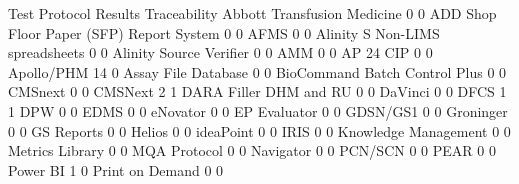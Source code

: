 \documentclass{article}
\begin{document}
\begin{Schunk}
\begin{Soutput}
                                           Test Protocol Results Traceability
  Abbott Transfusion Medicine                                  0            0
  ADD Shop Floor Paper (SFP) Report System                     0            0
  AFMS                                                         0            0
  Alinity S Non-LIMS spreadsheets                              0            0
  Alinity Source Verifier                                      0            0
  AMM                                                          0            0
  AP 24 CIP                                                    0            0
  Apollo/PHM                                                  14            0
  Assay File Database                                          0            0
  BioCommand Batch Control Plus                                0            0
  CMSnext                                                      0            0
  CMSNext                                                      2            1
  DARA Filler DHM and RU                                       0            0
  DaVinci                                                      0            0
  DFCS                                                         1            1
  DPW                                                          0            0
  EDMS                                                         0            0
  eNovator                                                     0            0
  EP Evaluator                                                 0            0
  GDSN/GS1                                                     0            0
  Groninger                                                    0            0
  GS Reports                                                   0            0
  Helios                                                       0            0
  ideaPoint                                                    0            0
  IRIS                                                         0            0
  Knowledge Management                                         0            0
  Metrics Library                                              0            0
  MQA Protocol                                                 0            0
  Navigator                                                    0            0
  PCN/SCN                                                      0            0
  PEAR                                                         0            0
  Power BI                                                     1            0
  Print on Demand                                              0            0

\end{Soutput}
\end{Schunk}
\end{document}
